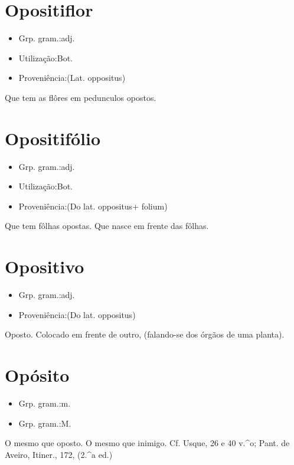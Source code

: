 \section{Opositiflor}
\begin{itemize}
\item {Grp. gram.:adj.}
\end{itemize}
\begin{itemize}
\item {Utilização:Bot.}
\end{itemize}
\begin{itemize}
\item {Proveniência:(Lat. \textunderscore oppositus\textunderscore )}
\end{itemize}
Que tem as flôres em pedunculos opostos.
\section{Opositifólio}
\begin{itemize}
\item {Grp. gram.:adj.}
\end{itemize}
\begin{itemize}
\item {Utilização:Bot.}
\end{itemize}
\begin{itemize}
\item {Proveniência:(Do lat. \textunderscore oppositus\textunderscore  + \textunderscore folium\textunderscore )}
\end{itemize}
Que tem fôlhas opostas.
Que nasce em frente das fôlhas.
\section{Opositivo}
\begin{itemize}
\item {Grp. gram.:adj.}
\end{itemize}
\begin{itemize}
\item {Proveniência:(Do lat. \textunderscore oppositus\textunderscore )}
\end{itemize}
Oposto.
Colocado em frente de outro, (falando-se dos órgãos de uma planta).
\section{Opósito}
\begin{itemize}
\item {Grp. gram.:m.}
\end{itemize}
\begin{itemize}
\item {Grp. gram.:M.}
\end{itemize}
O mesmo que \textunderscore oposto\textunderscore .
O mesmo que \textunderscore inimigo\textunderscore . Cf. \textunderscore Usque\textunderscore , 26 e 40 v.^o; Pant. de Aveiro, \textunderscore Itiner.\textunderscore , 172, (2.^a ed.)
